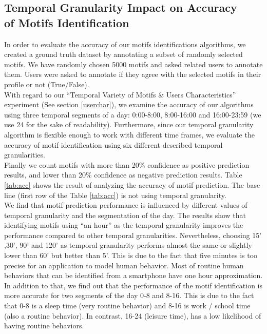 \documentclass{sig-alternate}
\begin{document}
\subsection{Temporal Granularity Impact on Accuracy \\ of Motifs Identification} \label{tempgral}
In order to evaluate the accuracy of our motifs identifications algorithms, we created a ground truth dataset by annotating a subset of randomly selected motifs. We have randomly chosen 5000 motifs and asked related users to annotate them. Users were asked to annotate if they agree with the selected motifs in their profile or not (True/False).\\
With regard to our ``Temporal Variety of Motifs \& Users Characteristics'' experiment (See section \ref{userchar}), we examine the accuracy of our algorithms using three temporal segments of a day: 0:00-8:00, 8:00-16:00 and 16:00-23:59 (we use 24 for the sake of readability). Furthermore, since our temporal granularity algorithm is flexible enough to work with different time frames, we evaluate the accuracy of motif identification using six different described temporal granularities. \\
Finally we count motifs with more than 20\% confidence as positive prediction results, and lower than 20\% confidence as negative prediction results. Table \ref{tab:acc} shows the result of analyzing the accuracy of motif prediction. The base line (first row of the Table \ref{tab:acc}) is not using temporal granularity.\\
We find that motif prediction performance is influenced by different values of temporal granularity and the segmentation of the day. The results show that identifying motifs using ``an hour'' as the temporal granularity improves the performance compared to other temporal granularities. Nevertheless, choosing 15' ,30', 90' and 120' as temporal granularity performs almost the same or slightly lower than 60' but better than 5'. This is due to the fact that five minutes is too precise for an application to model human behavior. Most of routine human behaviors that can be identified from a smartphone have one hour approximation. \\
In addition to that, we find out that the performance of the motif identification is more accurate for two segments of the day 0-8 and 8-16. This is due to the fact that 0-8 is a sleep time (very routine behavior) and 8-16 is work / school time (also a routine behavior). In contrast, 16-24 (leisure time), has a low likelihood of having routine behaviors. 
\vspace{-0.2cm}
\end{document}
